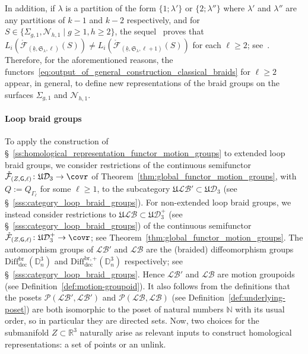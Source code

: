 \documentclass[AHL,Unicode,published]{cedram}
\newcommand{\Int}{\mathring}
\newcommand{\rdec}{\mathrm{dec}}
\newcommand{\LCS}{\varGamma}
\newcommand{\Sym}{\mathfrak{S}}
\newcommand{\fU}{\ensuremath{\mathfrak{U}}}
\newcommand{\N}{\mathscr{N}}
\newcommand{\sG}{\mathsf{G}}
\newcommand{\cB}{\mathcal{B}}
\newcommand{\cD}{\mathcal{D}}
\newcommand{\cF}{\mathcal{F}}
\newcommand{\cL}{\mathcal{L}}
\newcommand{\cP}{\mathcal{P}}
\newcommand{\bD}{\mathbb{D}}
\newcommand{\bN}{\mathbb{N}}
\newcommand{\bR}{\mathbb{R}}
\newcommand{\diffdecbr}{\ensuremath{\mathrm{Diff}_{\rdec}^{\mathrm{br}}}}
\newcommand{\diffdecbrplus}{\ensuremath{\mathrm{Diff}_{\rdec}^{\mathrm{br},+}}}
\renewcommand{\geq}{\geqslant}
\begin{document}
In addition, if $\lambda$ is a partition of the form $\boldsymbol{\{}1;\lambda'\boldsymbol{\}}$ or $\boldsymbol{\{}2;\lambda''\boldsymbol{\}}$ where $\lambda'$ and $\lambda''$ are any partitions of $k-1$ and $k-2$ respectively, and for $S\in\{\Sigma_{g,1}, \N_{h,1} \mid g\geq 1,h\geq 2\}$, the sequel~\cite{PSIN} proves that $L_{i}(\Int{\cF}_{(\underline{k},\Sym_{\lambda},\ell)}(S)) \neq L_{i}(\Int{\cF}_{(\underline{k},\Sym_{\lambda},\ell + 1)}(S))$ for each $\ell \geq 2$; see~\cite[Prop.~5.2]{PSIN}. Therefore, for the aforementioned reasons, the functors~\eqref{eq:output_of_general_construction_classical_braids} for $\ell\geq 2$ appear, in general, to define new representations of the braid groups on the surfaces $\Sigma_{g,1}$ and $\N_{h,1}$.


\paragraph*{Loop braid groups}
To apply the construction of \S~\ref{ss:homological_representation_functor_motion_groups} to extended loop braid groups, we consider restrictions of the continuous semifunctor $\Int{\cF}_{(Z,\sG,\ell)}\colon \fU\cD_3 \rightarrow \covr$ of Theorem~\ref{thm:global_functor_motion_groups}, with $Q:=Q_{\LCS_{\ell}}$ for some $\ell\geq 1$, to the subcategory $\fU\cL\cB' \subset \fU\cD_3$ (see \S~\ref{sss:category_loop_braid_groups}). For non-extended loop braid groups, we instead consider restrictions to $\fU\cL\cB \subset \fU\cD_3^{+}$ (see \S~\ref{sss:category_loop_braid_groups}) of the continuous semifunctor $\Int{\cF}_{(Z,\sG,\ell)}\colon \fU\cD^{+}_3 \to \covr$; see Theorem~\ref{thm:global_functor_motion_groups}. The automorphism groups of $\cL\cB'$ and $\cL\cB$ are the (braided) diffeomorphism groups $\diffdecbr(\bD^{3}_{n})$ and $\diffdecbrplus(\bD^{3}_{n})$ respectively; see \S~\ref{sss:category_loop_braid_groups}. Hence $\cL\cB'$ and $\cL\cB$ are motion groupoids (see Definition~\ref{def:motion-groupoid}). It also follows from the definitions that the posets $\cP(\cL\cB',\cL\cB')$ and $\cP(\cL\cB,\cL\cB)$ (see Definition~\ref{def:underlying-poset}) are both isomorphic to the poset of natural numbers $\bN$ with its usual order, so in particular they are directed sets. Now, two choices for the submanifold $Z \subset \bR^3$ naturally arise as relevant inputs to construct homological representations: a set of points or an unlink.
\end{document}
